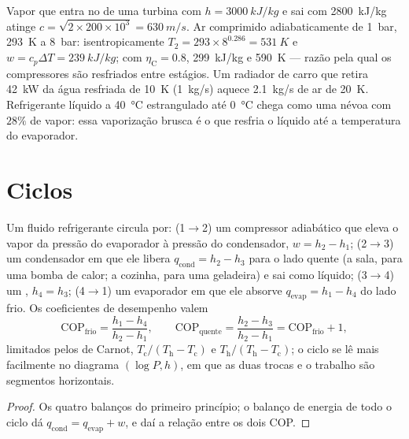 \begin{example}\label{ex:b2:open-systems:numbers}
Vapor que entra no  de uma turbina com $h = \qty{3000}{kJ/kg}$ e sai
com \qty{2800}{kJ/kg} atinge $c = \sqrt{2 \times 200 \times 10^3} =
\qty{630}{m/s}$. Ar comprimido adiabaticamente de \qty{1}{bar},
\qty{293}{K} a \qty{8}{bar}: isentropicamente $T_2 = 293 \times 8^{0.286} =
\qty{531}{K}$ e $w = c_p\Delta T = \qty{239}{kJ/kg}$; com $\eta_{\text{C}} =
0.8$, \qty{299}{kJ/kg} e \qty{590}{K} --- razão pela qual os compressores são
resfriados entre estágios. Um radiador de carro que retira \qty{42}{kW} da água
resfriada de \qty{10}{K} (\qty{1}{kg/s}) aquece \qty{2.1}{kg/s} de ar de
\qty{20}{K}. Refrigerante líquido a \qty{40}{\celsius} estrangulado até
\qty{0}{\celsius} chega como uma névoa com $28\%$ de vapor: essa vaporização brusca
é o que resfria o líquido até a temperatura do evaporador.
\end{example}

\section{Ciclos}

\begin{proposition}\label{prop:b2:open-systems:fridge}
Um fluido refrigerante circula por: (1$\to$2) um compressor adiabático
que eleva o vapor da pressão do evaporador à pressão do
condensador, $w = h_2 - h_1$; (2$\to$3) um condensador em que ele libera
$q_{\text{cond}} = h_2 - h_3$ para o lado quente (a sala, para uma bomba de calor; a
cozinha, para uma geladeira) e sai como líquido; (3$\to$4) um , $h_4
= h_3$; (4$\to$1) um evaporador em que ele absorve $q_{\text{evap}} = h_1 - h_4$
do lado frio. Os coeficientes de desempenho valem
\[
\mathrm{COP}_{\text{frio}} = \frac{h_1 - h_4}{h_2 - h_1}, \qquad
\mathrm{COP}_{\text{quente}} = \frac{h_2 - h_3}{h_2 - h_1} = \mathrm{COP}_{\text{frio}} + 1 ,
\]
limitados pelos de Carnot, $T_{\text{c}}/(T_{\text{h}} - T_{\text{c}})$ e
$T_{\text{h}}/(T_{\text{h}} - T_{\text{c}})$; o ciclo se lê mais facilmente no
diagrama $(\log P, h)$, em que as duas trocas e o trabalho são
segmentos horizontais.
\end{proposition}

\begin{proof}
Os quatro balanços do primeiro princípio; o balanço de energia de todo o ciclo
dá $q_{\text{cond}} = q_{\text{evap}} + w$, e daí a relação entre
os dois COP.
\end{proof}

